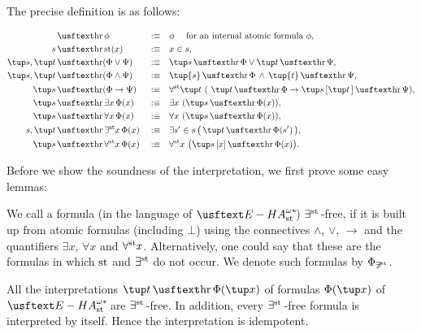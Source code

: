 The precise definition is as follows:
\begin{dfn}\label{d:herRel}
\begin{align*}
[]&\hr \phi  & &:\equiv& &\phi\quad \text { for an internal atomic formula $\phi$}, \\
s&\hr \st(x) & &:\equiv& & x \in s, \\
\tup s, \tup t&\hr (\Phi\vee\Psi) & &:\equiv& &\tup s\hr\Phi\vee \tup t\hr\Psi,\\
 \tup s, \tup t & \hr (\Phi \wedge \Psi) & &:\equiv& &\tup {s}\hr\Phi \, \land \, \tup {t}\hr\Psi,\\
\tup s&\hr (\Phi \rightarrow \Psi) & &:\equiv& & \forallst \tup t\ (\ \tup t\hr\Phi
 \rightarrow\tup s \, [\tup t \, ] \hr\Psi),\\
\tup s&\hr \exists x \, \Phi(x) & &:\equiv& & \exists x\ (\tup s\hr\Phi(x)),\\
\tup s&\hr \forall x \, \Phi(x) & &:\equiv& & \forall x\ (\tup s\hr\Phi(x)),\\
s, \tup t &\hr \existsst x \, \Phi(x) & &:\equiv & & \exists s' \in s \, \big( \, \tup t \hr \Phi(s') \, \big),\\
\tup s &\hr \forallst x \, \Phi(x) & &:\equiv& & \forallst x\ \big(\tup s \, [x] \hr \Phi(x)\big).
\end{align*}
\end{dfn}

Before we show the soundness of the interpretation, we first prove some easy lemmas:

\begin{dfn}
We call a formula (in the language of $\ehaststar$) $\exists^{\operatorname{st}{}}$-free, if it is built up from atomic formulas (including $\bot$) using the connectives $\wedge$, $\lor$, $\to$ and the quantifiers $\exists x$, $\forall x$ and $\forall^{\operatorname{st}{}}\! x$. Alternatively, one could say that these are the formulas in which $\operatorname{st}$ and $\exists^{\operatorname{st}{}}\!$ do not occur. We denote such formulas by $\Phi_{\not\exists^{\operatorname{st}}}$.
\end{dfn}

\begin{lemma}\label{l:IntOfEFFormulas} All the interpretations $\tup t \hr \Phi(\tup x)$ of formulas $\Phi(\tup x)$ of $\ehaststar$ are $\exists^{\operatorname{st}{}}$-free. In addition, every $\exists^{\operatorname{st}{}}$-free formula is interpreted by itself. Hence the interpretation is idempotent.
\end{lemma}

